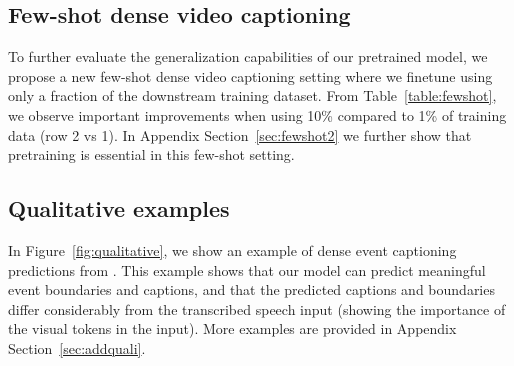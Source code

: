 \begin{table}[t]
\begin{center}
\setlength\tabcolsep{6pt}
\vspace{-0.3cm}
\caption{\small \textbf{Few-shot dense event captioning}, by finetuning \model{} using a small fraction of the downstream training dataset.}  
\label{table:fewshot}
\end{center}
\vspace{-1cm}
\end{table}

\subsection{Few-shot dense video captioning}\label{sec:fewshot}
To further evaluate the generalization capabilities of our pretrained \model{} model, we propose a new few-shot dense video captioning setting where we finetune \model{} using only a fraction of the downstream training dataset.
From Table~\ref{table:fewshot}, we observe important improvements when using 10\% compared to 1\% of training data (row 2 vs 1).
In Appendix Section~\ref{sec:fewshot2} we further show that pretraining is essential in this few-shot setting.

\vspace{-0.1cm}
\subsection{Qualitative examples}\label{sec:qualitative}
In Figure~\ref{fig:qualitative}, we show an example of dense event captioning predictions from \model{}.
This example shows that our model can predict meaningful event boundaries and captions, and that the predicted captions and boundaries differ considerably from the transcribed speech input (showing the importance of the visual tokens in the input).
More examples are provided in Appendix Section~\ref{sec:addquali}.